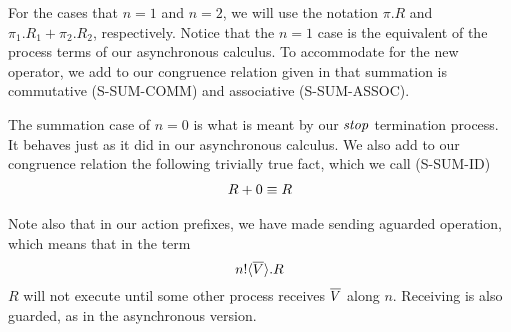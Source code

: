 For the cases that $n=1$ and $n=2$, we will use the notation $\pi.R$ and $\pi_1.R_1 + \pi_2.R_2$, respectively.  Notice that the $n=1$ case is the equivalent of the process terms of our asynchronous calculus.
To accommodate for the new operator, we add to our congruence relation given in  that summation is commutative (S-SUM-COMM) and associative (S-SUM-ASSOC).

The summation case of $n=0$ is what is meant by our $\mbox{\emph{stop}}$ termination process.  
It behaves just as it did in our asynchronous calculus.
We also add to our congruence relation the following trivially true fact, which we call (S-SUM-ID)
\begin{align*}
	R + 0 \equiv R
\end{align*}

Note also that in our action prefixes, we have made sending aguarded operation, which means that in the term
\[
	{n}!\langle{ \ensuremath{\overline{V}} }\rangle.R
\]
$R$ will not execute until some other process receives $\overline{V}$ along $n$.  
Receiving is also guarded, as in the asynchronous version.  



